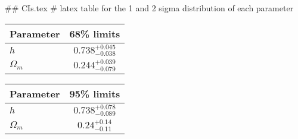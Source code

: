 ## CIs.tex
# latex table for the 1 and 2 sigma distribution of each parameter

\begin{tabular} { l  c}
 Parameter &  68\% limits\\
\hline
{\boldmath$h              $} & $0.738^{+0.045}_{-0.038}   $\\
{\boldmath$\Omega_m       $} & $0.244^{+0.039}_{-0.079}   $\\
\hline
\end{tabular}

\begin{tabular} { l  c}
 Parameter &  95\% limits\\
\hline
{\boldmath$h              $} & $0.738^{+0.078}_{-0.089}   $\\
{\boldmath$\Omega_m       $} & $0.24^{+0.14}_{-0.11}      $\\
\hline
\end{tabular}
